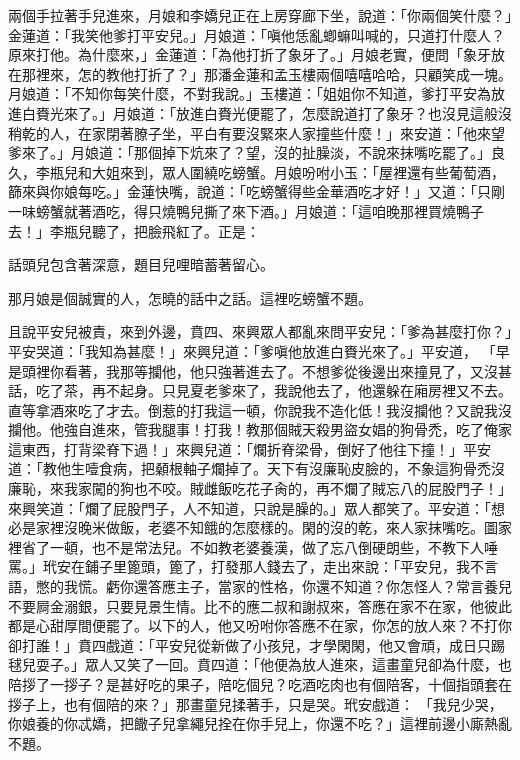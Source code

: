 兩個手拉著手兒進來，月娘和李嬌兒正在上房穿廊下坐，說道：「你兩個笑什麼？」金蓮道：「我笑他爹打平安兒。」月娘道：「嗔他恁亂蝍䗫叫喊的，只道打什麼人？原來打他。為什麼來，」金蓮道：「為他打折了象牙了。」月娘老實，便問「象牙放在那裡來，怎的教他打折了？」那潘金蓮和孟玉樓兩個嘻嘻哈哈，只顧笑成一塊。月娘道：「不知你每笑什麼，不對我說。」玉樓道：「姐姐你不知道，爹打平安為放進白賚光來了。」月娘道：「放進白賚光便罷了，怎麼說道打了象牙？也沒見這般沒稍乾的人，在家閉著膫子坐，平白有要沒緊來人家撞些什麼！」來安道：「他來望爹來了。」月娘道：「那個掉下炕來了？望，沒的扯臊淡，不說來抹嘴吃罷了。」良久，李瓶兒和大姐來到，眾人圍繞吃螃蟹。月娘吩咐小玉：「屋裡還有些葡萄酒，篩來與你娘每吃。」金蓮快嘴，說道：「吃螃蟹得些金華酒吃才好！」又道：「只剛一味螃蟹就著酒吃，得只燒鴨兒撕了來下酒。」月娘道：「這咱晚那裡買燒鴨子去！」李瓶兒聽了，把臉飛紅了。正是：

話頭兒包含著深意，題目兒哩暗蓄著留心。

那月娘是個誠實的人，怎曉的話中之話。這裡吃螃蟹不題。

且說平安兒被責，來到外邊，賁四、來興眾人都亂來問平安兒：「爹為甚麼打你？」平安哭道：「我知為甚麼！」來興兒道：「爹嗔他放進白賚光來了。」平安道， 「早是頭裡你看著，我那等攔他，他只強著進去了。不想爹從後邊出來撞見了，又沒甚話，吃了茶，再不起身。只見夏老爹來了，我說他去了，他還躲在廂房裡又不去。直等拿酒來吃了才去。倒惹的打我這一頓，你說我不造化低！我沒攔他？又說我沒攔他。他強自進來，管我腿事！打我！教那個賊天殺男盜女娼的狗骨禿，吃了俺家這東西，打背梁脊下過！」來興兒道：「爛折脊梁骨，倒好了他往下撞！」平安道：「教他生噎食病，把顙根軸子爛掉了。天下有沒廉恥皮臉的，不象這狗骨禿沒廉恥，來我家闖的狗也不咬。賊雌飯吃花子肏的，再不爛了賊忘八的屁股門子！」來興笑道：「爛了屁股門子，人不知道，只說是臊的。」眾人都笑了。平安道：「想必是家裡沒晚米做飯，老婆不知餓的怎麼樣的。閑的沒的乾，來人家抹嘴吃。圖家裡省了一頓，也不是常法兒。不如教老婆養漢，做了忘八倒硬朗些，不教下人唾罵。」玳安在鋪子里篦頭，篦了，打發那人錢去了，走出來說：「平安兒，我不言語，憋的我慌。虧你還答應主子，當家的性格，你還不知道？你怎怪人？常言養兒不要屙金溺銀，只要見景生情。比不的應二叔和謝叔來，答應在家不在家，他彼此都是心甜厚間便罷了。以下的人，他又吩咐你答應不在家，你怎的放人來？不打你卻打誰！」賁四戲道：「平安兒從新做了小孩兒，才學閑閑，他又會頑，成日只踢毬兒耍子。」眾人又笑了一回。賁四道：「他便為放人進來，這畫童兒卻為什麼，也陪拶了一拶子？是甚好吃的果子，陪吃個兒？吃酒吃肉也有個陪客，十個指頭套在拶子上，也有個陪的來？」那畫童兒揉著手，只是哭。玳安戲道： 「我兒少哭，你娘養的你忒嬌，把饊子兒拿繩兒拴在你手兒上，你還不吃？」這裡前邊小廝熱亂不題。

